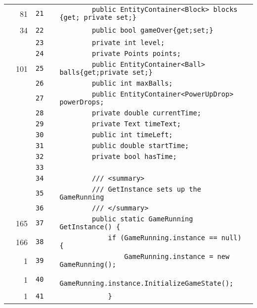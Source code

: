 \documentclass[a4paper,landscape,10pt]{article}
\begin{document}
\begin{longtable}[l]{lrrll}
\cellcolor{green} & 81 & \verb~21~ & & \verb~        public EntityContainer<Block> blocks {get; private set;}~\\
\cellcolor{green} & 34 & \verb~22~ & & \verb~        public bool gameOver{get;set;}~\\
\cellcolor{gray} &  & \verb~23~ & & \verb~        private int level;~\\
\cellcolor{gray} &  & \verb~24~ & & \verb~        private Points points;~\\
\cellcolor{green} & 101 & \verb~25~ & & \verb~        public EntityContainer<Ball> balls{get;private set;}~\\
\cellcolor{gray} &  & \verb~26~ & & \verb~        public int maxBalls;~\\
\cellcolor{gray} &  & \verb~27~ & & \verb~        public EntityContainer<PowerUpDrop> powerDrops;~\\
\cellcolor{gray} &  & \verb~28~ & & \verb~        private double currentTime;~\\
\cellcolor{gray} &  & \verb~29~ & & \verb~        private Text timeText;~\\
\cellcolor{gray} &  & \verb~30~ & & \verb~        public int timeLeft;~\\
\cellcolor{gray} &  & \verb~31~ & & \verb~        public double startTime;~\\
\cellcolor{gray} &  & \verb~32~ & & \verb~        private bool hasTime;~\\
\cellcolor{gray} &  & \verb~33~ & & \verb~~\\
\cellcolor{gray} &  & \verb~34~ & & \verb~        /// <summary>~\\
\cellcolor{gray} &  & \verb~35~ & & \verb~        /// GetInstance sets up the GameRunning~\\
\cellcolor{gray} &  & \verb~36~ & & \verb~        /// </summary>~\\
\cellcolor{green} & 165 & \verb~37~ & & \verb~        public static GameRunning GetInstance() {~\\
\cellcolor{green} & 166 & \verb~38~ & & \verb~            if (GameRunning.instance == null) {~\\
\cellcolor{green} & 1 & \verb~39~ & & \verb~                GameRunning.instance = new GameRunning();~\\
\cellcolor{green} & 1 & \verb~40~ & & \verb~                GameRunning.instance.InitializeGameState();~\\
\cellcolor{green} & 1 & \verb~41~ & & \verb~            }~\\

\end{longtable}
\end{document}

